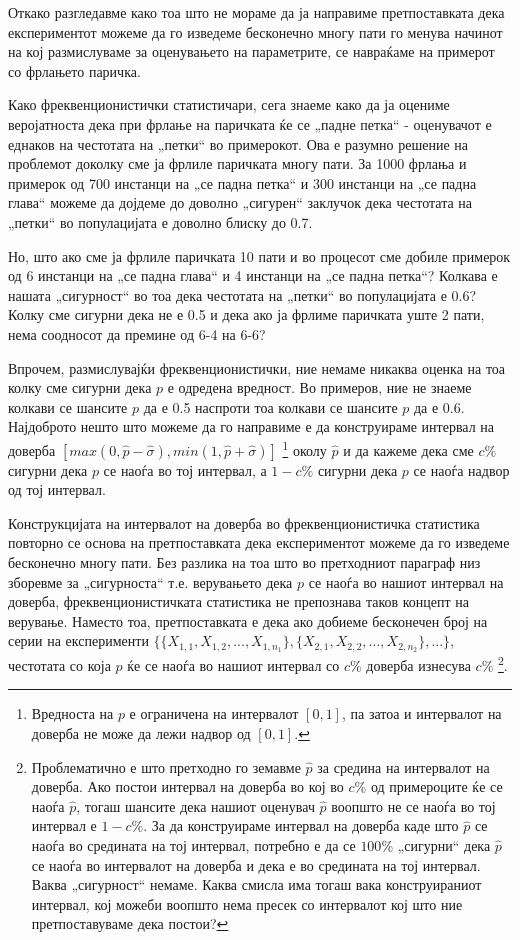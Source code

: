 \documentclass[12pt]{article}
\numberwithin{equation}{section}
\begin{document}
Откако разгледавме како тоа што не мораме да ја направиме претпоставката дека експериментот можеме да го изведеме бесконечно многу пати го менува начинот на кој размислуваме за оценувањето на параметрите, се навраќаме на примерот со фрлањето паричка.

Како фреквенционистички статистичари, сега знаеме како да ја оцениме веројатноста дека при фрлање на паричката ќе се „падне петка“ - оценувачот е еднаков на честотата на „петки“ во примерокот. Ова е разумно решение на проблемот доколку сме ја фрлиле паричката многу пати. За 1000 фрлања и примерок од 700 инстанци на „се падна петка“ и 300 инстанци на „се падна глава“ можеме да дојдеме до доволно „сигурен“ заклучок дека честотата на „петки“ во популацијата е доволно блиску до 0.7.

Но, што ако сме ја фрлиле паричката 10 пати и во процесот сме добиле примерок од 6 инстанци на „се падна глава“ и 4 инстанци на „се падна петка“? Колкава е нашата „сигурност“ во тоа дека честотата на „петки“ во популацијата е 0.6? Колку сме сигурни дека не е 0.5 и дека ако ја фрлиме паричката уште 2 пати, нема соодносот да премине од 6-4 на 6-6?

Впрочем, размислувајќи фреквенционистички, ние немаме никаква оценка на тоа колку сме сигурни дека \(p\) е одредена вредност. Во примеров, ние не знаеме колкави се шансите \(p\) да е 0.5 наспроти тоа колкави се шансите \(p\) да е 0.6. Најдоброто нешто што можеме да го направиме е да конструираме интервал на доверба \([max(0, \widehat{p} - \widehat{\sigma}), min(1, \widehat{p} + \widehat{\sigma})]\) \footnote{Вредноста на \(p\) е ограничена на интервалот \([0, 1]\), па затоа и интервалот на доверба не може да лежи надвор од \([0, 1]\).} околу \(\widehat{p}\) и да кажеме дека сме \(c\%\) сигурни дека \(p\) се наоѓа во тој интервал, а \(1-c\%\) сигурни дека \(p\) се наоѓа надвор од тој интервал.

Конструкцијата на интервалот на доверба во фреквенционистичка статистика повторно се основа на претпоставката дека експериментот можеме да го изведеме бесконечно многу пати. Без разлика на тоа што во претходниот параграф низ зборевме за „сигурноста“ т.е. верувањето дека \(p\) се наоѓа во нашиот интервал на доверба, фреквенционистичката статистика не препознава таков концепт на верување. Наместо тоа, претпоставката е дека ако добиеме бесконечен број на серии на експерименти \(\{\{X_{1,1}, X_{1,2}, ..., X_{1,n_1}\}, \{X_{2,1}, X_{2,2}, ..., X_{2,n_2}\}, ...\}\), честотата со која \(p\) ќе се наоѓа во нашиот интервал со \(c\%\) доверба изнесува \(c\%\) \footnote{Проблематично е што претходно го земавме \(\widehat{p}\) за средина на интервалот на доверба. Ако постои интервал на доверба во кој во \(c\%\) од примероците ќе се наоѓа \(\widehat{p}\), тогаш шансите дека нашиот оценувач \(\widehat{p}\) воопшто не се наоѓа во тој интервал е \(1 - c\%\). За да конструираме интервал на доверба каде што \(\widehat{p}\) се наоѓа во средината на тој интервал, потребно е да се \(100\%\) „сигурни“ дека \(\widehat{p}\) се наоѓа во интервалот на доверба и дека е во средината на тој интервал. Ваква „сигурност“ немаме. Каква смисла има тогаш вака конструираниот интервал, кој можеби воопшто нема пресек со интервалот кој што ние претпоставуваме дека постои?}.
\end{document}
